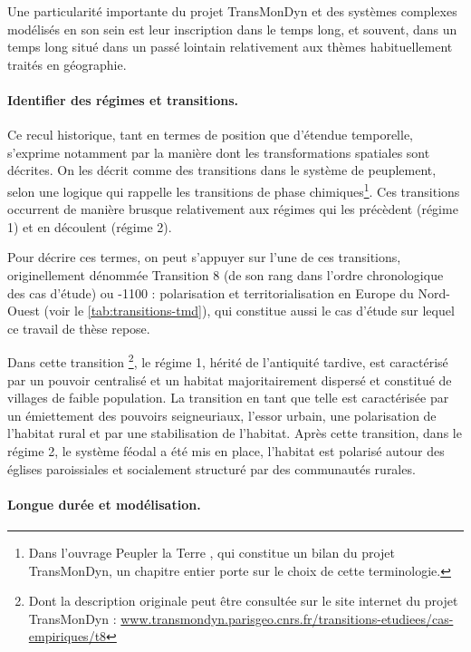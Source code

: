 Une particularité importante du projet TransMonDyn et des systèmes complexes modélisés en son sein est leur inscription dans le temps long, et souvent, dans un temps long situé dans un passé lointain relativement aux thèmes habituellement traités en géographie.

\paragraph{Identifier des \og régimes\fg{} et \og transitions\fg{}.}

Ce recul historique, tant en termes de position que d'étendue temporelle, s'exprime notamment par la manière dont les transformations spatiales sont décrites.
On les décrit comme des \og transitions\fg{} dans le système de peuplement, selon une logique qui rappelle les transitions de phase chimiques\footnote{
	Dans l'ouvrage \og Peupler la Terre\fg{} \autocite{sanders2018peupler}, qui constitue un bilan du projet TransMonDyn, un chapitre entier \autocite{pumain_convergences_2017} porte sur le choix de cette terminologie.
}.
Ces transitions occurrent de manière brusque relativement aux \og régimes\fg{} qui les précèdent (\og régime 1\fg{}) et en découlent (\og régime 2\fg{}).

Pour décrire ces termes, on peut s'appuyer sur l'une de ces transitions, originellement dénommée \og Transition 8\fg{} (de son rang dans l'ordre chronologique des cas d'étude) ou -1100 : polarisation et territorialisation en Europe du Nord-Ouest\fg{} (voir le \cref{tab:transitions-tmd}), qui constitue aussi le cas d'étude sur lequel ce travail de thèse repose.

Dans cette transition \footnote{
Dont la description originale peut être consultée sur le site internet du projet \mbox{TransMonDyn} : \href{http://www.transmondyn.parisgeo.cnrs.fr/transitions-etudiees/cas-empiriques/t8}{www.transmondyn.parisgeo.cnrs.fr/transitions-etudiees/cas-empiriques/t8}
}, le régime 1, hérité de l'antiquité tardive, est caractérisé par un pouvoir centralisé et un habitat majoritairement dispersé et constitué de villages de faible population.
La transition en tant que telle est caractérisée par un émiettement des pouvoirs seigneuriaux, l'essor urbain, une polarisation de l'habitat rural et par une stabilisation de l'habitat.
Après cette transition, dans le régime 2, le système féodal a été mis en place, l'habitat est polarisé autour des églises paroissiales et socialement structuré par des communautés rurales.

\paragraph{Longue durée et modélisation.}

